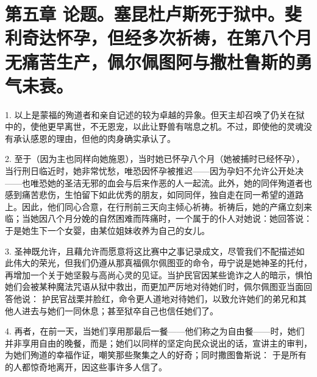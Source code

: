 
\section{第五章 论题。塞昆杜卢斯死于狱中。斐利奇达怀孕，但经多次祈祷，在第八个月无痛苦生产，佩尔佩图阿与撒杜鲁斯的勇气未衰。}

1. 以上是蒙福的殉道者和亲自记述的较为卓越的异象。但天主却召唤了仍关在狱中的，使他更早离世，不无恩宠，以此让野兽有喘息之机。不过，即使他的灵魂没有承认感恩的理由，但他的肉身确实承认了。\par

2. 至于（因为主也同样向她施恩），当时她已怀孕八个月（她被捕时已经怀孕），当行刑日临近时，她非常忧愁，唯恐因怀孕被推迟——因为孕妇不允许公开处决——也唯恐她的圣洁无邪的血会与后来作恶的人一起流。此外，她的同伴殉道者也感到痛苦悲伤，生怕留下如此优秀的朋友，如同同伴，独自走在同一希望的道路上。因此，他们同心合意，在行刑前三天向主倾心祈祷。祈祷后，她的产痛立刻来临；当她因八个月分娩的自然困难而阵痛时，一个属于的仆人对她说：她回答说：于是她生下一个女婴，由某位姐妹收养为自己的女儿。\par

3. 圣神既允许，且藉允许而愿意将这比赛中之事记录成文，尽管我们不配描述如此伟大的荣光，但我们仍遵从那真福佩尔佩图亚的命令，毋宁说是她神圣的托付，再增加一个关于她坚毅与高尚心灵的见证。当护民官因某些诡诈之人的暗示，惧怕她们会被某种魔法咒语从狱中救出，而更加严厉地对待她们时，佩尔佩图亚当面回答他说： 护民官战栗并脸红，命令更人道地对待她们，以致允许她们的弟兄和其他人进去与她们一同休息；甚至狱卒自己也信任她们了。\par

4. 再者，在前一天，当她们享用那最后一餐——他们称之为自由餐——时，她们并非享用自由的晚餐，而是；她们以同样的坚定向民众说出的话，宣讲主的审判，为她们殉道的幸福作证，嘲笑那些聚集之人的好奇；同时撒图鲁斯说： 于是所有的人都惊奇地离开，因这些事许多人信了。\par

